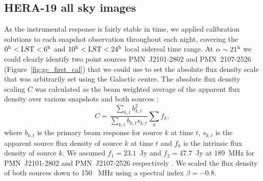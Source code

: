 \documentclass[a0,portrait]{a0poster}
\begin{document}
\begin{multicols}{2}
%

\section*{HERA-19 all sky images}
As the instrumental response is fairly stable in time, we applied calibration solutions to each snapshot observation throughout each night, covering the $0^{\rm h} < {\rm LST} < 6^{\rm h}$ and $10^{\rm h} < {\rm LST} < 24^{\rm h}$ local sidereal time range. At $\alpha \sim 21^{\rm h}$ we could clearly identify two point sources PMN~J2101-2802 and PMN~2107-2526 (Figure~\ref{fig:gc_first_cal}) that we could use to set the absolute flux density scale that was arbitrarily set using the Galactic centre. The absolute flux density scaling $C$ was calculated as the beam weighted average of the apparent flux density over various snapshots and both sources \citep{jacobs2013flux}:
\begin{equation}
C = \frac{\sum_{k,t} b^2_{k,t}}{\sum_{k,t} b_{k,t} s_{k,t}} \sum_k{f_k},
\label{eq:c}
\end{equation}
where $b_{k,t}$ is the primary beam response for source $k$ at time $t$, $s_{k,t}$ is the apparent source flux density of source $k$ at time $t$ and $f_{k}$ is the intrinsic flux density of source $k$. We assumed $f_1 = 23.1$~Jy and $f_2 = 47.7$~Jy at 189~MHz for PMN~J2101-2802 and PMN~J2107-2526 respectively \citep{bernardi2013189}. We scaled the flux density of both sources down to 150 ~MHz using a spectral index $\beta = -0.8$.


\end{multicols}
\end{document}
